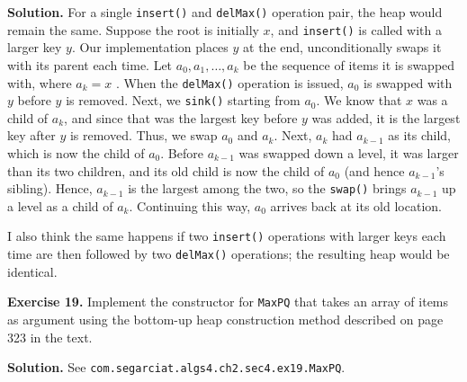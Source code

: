 \documentclass[12pt, a4paper]{article}
\newenvironment{ex}[2][Exercise]
{\par\medskip\noindent \textbf{#1 #2.}}
{\medskip}
\newenvironment{sol}[1][Solution]
{\par\medskip\noindent \textbf{#1.} }
{\medskip}
\begin{document}
	\begin{sol}
		For a single \texttt{insert()} and \texttt{delMax()} operation pair, the heap would remain
		the same. Suppose the root is initially $x$, and \texttt{insert()} is called
		with a larger key $y$. Our implementation places $y$ at the end,
		unconditionally swaps it with its parent each time. Let $a_0,a_1,\ldots,a_k$ be
		the sequence of items it is swapped with, where $a_k=x$ . When the \texttt{delMax()}
		operation is issued, $a_0$ is swapped with $y$ before $y$ is removed. Next,
		we \texttt{sink()} starting from $a_0$. We know that $x$ was a child of
		$a_k$, and since that was the largest key before $y$ was added, it is the
		largest key after $y$ is removed. Thus, we swap $a_0$ and $a_k$. Next, $a_k$
		had $a_{k-1}$ as its child, which is now the child of $a_0$. Before $a_{k-1}$
		was swapped down a level, it was larger than its two children, and its old child
		is now the child of $a_0$ (and hence $a_{k-1}$'s sibling). Hence, $a_{k-1}$
		is the largest among the two, so the \texttt{swap()} brings $a_{k-1}$ up a level
		as a child of $a_{k}$. Continuing this way, $a_0$ arrives back at its old location.
		
		I also think the same happens if two \texttt{insert()} operations with larger
		keys each time are then followed by two \texttt{delMax()} operations; the
		resulting heap would be identical.
	\end{sol}
	\begin{ex}{19}
		Implement the constructor for \texttt{MaxPQ} that takes an array of items as
		argument using the bottom-up heap construction method described on page 323
		in the text.
	\end{ex}
	\begin{sol}
		See \texttt{com.segarciat.algs4.ch2.sec4.ex19.MaxPQ}.
	\end{sol}
	\pagebreak
	\printbibliography
\end{document}
